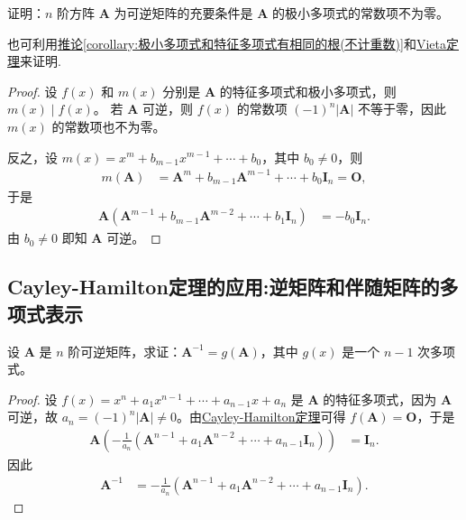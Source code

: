 \documentclass[../../main.tex]{subfiles}%
\begin{document}
\begin{proposition}\label{proposition:矩阵可逆充要条件极小多项式常数项非零}
证明：\(n\) 阶方阵 \(\boldsymbol{A}\) 为可逆矩阵的充要条件是 \(\boldsymbol{A}\) 的极小多项式的常数项不为零。
\end{proposition}
\begin{note}
也可利用\hyperref[corollary:极小多项式和特征多项式有相同的根(不计重数)]{推论\ref{corollary:极小多项式和特征多项式有相同的根(不计重数)}}和\hyperref[theorem:Vieta定理]{Vieta定理}来证明.
\end{note}
\begin{proof}
设 \(f(x)\) 和 \(m(x)\) 分别是 \(\boldsymbol{A}\) 的特征多项式和极小多项式，则 \(m(x)\mid f(x)\)。
若 \(\boldsymbol{A}\) 可逆，则 \(f(x)\) 的常数项 \((-1)^n|\boldsymbol{A}|\) 不等于零，因此 \(m(x)\) 的常数项也不为零。

反之，设 \(m(x)=x^m + b_{m - 1}x^{m - 1}+\cdots + b_0\)，其中 \(b_0\neq 0\)，则
\begin{align*}
m(\boldsymbol{A})&=\boldsymbol{A}^m + b_{m - 1}\boldsymbol{A}^{m - 1}+\cdots + b_0\boldsymbol{I}_n=\boldsymbol{O},
\end{align*}
于是
\begin{align*}
\boldsymbol{A}(\boldsymbol{A}^{m - 1}+b_{m - 1}\boldsymbol{A}^{m - 2}+\cdots + b_1\boldsymbol{I}_n)&=-b_0\boldsymbol{I}_n.
\end{align*}
由 \(b_0\neq 0\) 即知 \(\boldsymbol{A}\) 可逆。
\end{proof}

\subsection{Cayley-Hamilton定理的应用:逆矩阵和伴随矩阵的多项式表示}

\begin{proposition}[矩阵的逆可由其多项式表示]\label{proposition:矩阵的逆可以用其多项式表示}
设 \(\boldsymbol{A}\) 是 \(n\) 阶可逆矩阵，求证：\(\boldsymbol{A}^{-1}=g(\boldsymbol{A})\)，其中 \(g(x)\) 是一个 \(n - 1\) 次多项式。
\end{proposition}
\begin{proof}
设 \(f(x)=x^n + a_1x^{n - 1}+\cdots + a_{n - 1}x + a_n\) 是 \(\boldsymbol{A}\) 的特征多项式，因为 \(\boldsymbol{A}\) 可逆，故 \(a_n = (-1)^n|\boldsymbol{A}|\neq 0\)。由\hyperref[theorem:Cayley-Hamilton定理]{Cayley-Hamilton定理}可得 \(f(\boldsymbol{A})=\boldsymbol{O}\)，于是
\begin{align*}
\boldsymbol{A}\left(-\frac{1}{a_n}(\boldsymbol{A}^{n - 1}+a_1\boldsymbol{A}^{n - 2}+\cdots + a_{n - 1}\boldsymbol{I}_n)\right)&=\boldsymbol{I}_n.
\end{align*}
因此
\begin{align*}
\boldsymbol{A}^{-1}&=-\frac{1}{a_n}(\boldsymbol{A}^{n - 1}+a_1\boldsymbol{A}^{n - 2}+\cdots + a_{n - 1}\boldsymbol{I}_n).
\end{align*} 
\end{proof}
\end{document}
